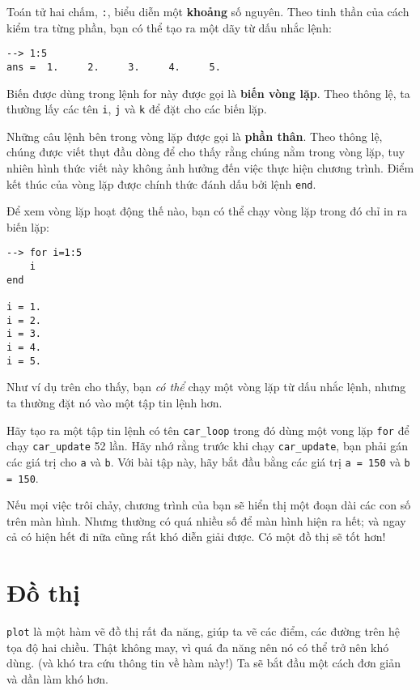 \documentclass[12pt]{book}
\begin{document}
Toán tử hai chấm, {\tt :}, biểu diễn một {\bf khoảng} số nguyên. Theo
tinh thần của cách kiểm tra từng phần, bạn có thể tạo ra một dãy
từ dấu nhắc lệnh:

\begin{verbatim} 
--> 1:5
ans =  1.     2.     3.     4.     5.
\end{verbatim}
%
Biến được dùng trong lệnh for này được gọi là {\bf biến vòng lặp}.
Theo thông lệ, ta thường lấy các tên {\tt i}, {\tt j} và {\tt k} để đặt cho
các biến lặp.

Những câu lệnh bên trong vòng lặp được gọi là {\bf phần thân}.  
Theo thông lệ, chúng được viết thụt đầu dòng để cho thấy rằng
chúng nằm trong vòng lặp, tuy nhiên hình thức viết này không ảnh
hưởng đến việc thực hiện chương trình. Điểm kết thúc của vòng
lặp được chính thức đánh dấu bởi lệnh {\tt end}.

Để xem vòng lặp hoạt động thế nào, bạn có thể chạy vòng lặp
trong đó chỉ in ra biến lặp:

\begin{verbatim}
--> for i=1:5
    i
end

i = 1.
i = 2.
i = 3.
i = 4.
i = 5.
\end{verbatim}
%
Như ví dụ trên cho thấy, bạn {\em có thể} chạy một vòng lặp
từ dấu nhắc lệnh, nhưng ta thường đặt nó vào một tập tin lệnh hơn.

\begin{ex}
Hãy tạo ra một tập tin lệnh có tên \verb#car_loop# trong đó dùng
một vong lặp {\tt for} để chạy \verb#car_update# 52 lần. Hãy nhớ
rằng trước khi chạy \verb#car_update#, bạn phải gán các giá trị
cho {\tt a} và {\tt b}. Với bài tập này, hãy bắt đầu bằng các giá trị  
{\tt a = 150} và {\tt b = 150}.

Nếu mọi việc trôi chảy, chương trình của bạn sẽ hiển thị một 
đoạn dài các con số trên màn hình. Nhưng thường có quá nhiều
số để màn hình hiện ra hết; và ngay cả có hiện hết đi nữa cũng
rất khó diễn giải được. Có một đồ thị sẽ tốt hơn!
\end{ex}


\section{Đồ thị}
\label{plotting}

{\tt plot} là một hàm vẽ đồ thị rất đa năng, giúp ta vẽ các điểm,
các đường trên hệ tọa độ hai chiều. Thật không may, vì quá đa năng
nên nó có thể trở nên khó dùng. (và khó tra cứu thông tin về hàm này!)
Ta sẽ bắt đầu một cách đơn giản và dần làm khó hơn.
\end{document}
